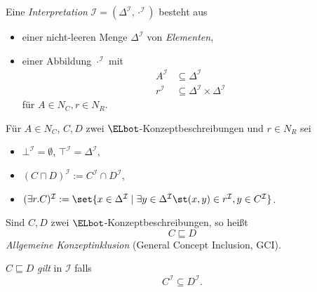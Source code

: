 \documentclass[ngerman]{beamer}
\begin{document}
\begin{frame}

  \onslide<+->

  \begin{Definition}
    Eine \emph{Interpretation} $\mathcal{I} = (\Delta^{\mathcal{I}}, \cdot^{\mathcal{I}})$
    besteht aus
    \begin{itemize}
    \item<+-> einer nicht-leeren Menge $\Delta^{\mathcal{I}}$ von \emph{Elementen},
    \item<+-> einer Abbildung $\cdot^{\mathcal{I}}$ mit
      \begin{align*}
        A^{\mathcal{I}} &\subseteq \Delta^{\mathcal{I}} \\
        r^{\mathcal{I}} &\subseteq \Delta^{\mathcal{I}} \times \Delta^{\mathcal{I}}
      \end{align*}
      für $A \in N_{C}, r \in N_{R}$.
    \end{itemize}
  \end{Definition}

  \onslide<+->

  \begin{Definition}
    Für $A \in N_C$, $C, D$ zwei $\ELbot$-Konzeptbeschreibungen und $r \in N_R$ sei
    \begin{itemize}
    \item $\bot^{\mathcal{I}} = \emptyset$, $\top^{\mathcal{I}} = \Delta^{\mathcal{I}}$,
    \item $(C \sqcap D)^{\mathcal{I}} := C^{\mathcal{I}} \cap D^{\mathcal{I}}$,
    \item $(\exists r. C)^{\mathcal{I}} := \set{ x \in \Delta^{\mathcal{I}} \mid \exists y
        \in \Delta^{\mathcal{I}} \st (x, y) \in r^{\mathcal{I}}, y \in C^{\mathcal{I}} }$.
    \end{itemize}
  \end{Definition}

\end{frame}

\begin{frame}

  \onslide<+->

  \begin{Definition}
    Sind $C, D$ zwei $\ELbot$-Konzeptbeschreibungen, so heißt
    \begin{equation*}
      C \sqsubseteq D
    \end{equation*}
    \emph{Allgemeine Konzeptinklusion} (General Concept Inclusion, GCI).

    \onslide<+->%
    \medskip{}
    $C \sqsubseteq D$ \emph{gilt} in $\mathcal{I}$ falls
    \begin{equation*}
      C^{\mathcal{I}} \subseteq D^{\mathcal{I}}.
    \end{equation*}
  \end{Definition}

\end{frame}
\end{document}
